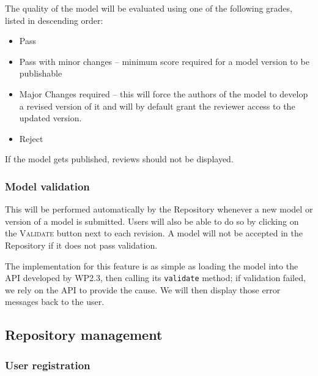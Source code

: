 \begin{techNote}
The quality of the model will be evaluated using one of the following grades, listed in descending order:
\begin{itemize}
\item Pass
\item Pass with minor changes -- minimum score required for a model version to be publishable
\item Major Changes required -- this will force the authors of the model to develop a revised version of it and will by default grant the reviewer access to the updated version. 
\item Reject
\end{itemize}
If the model gets published, reviews should not be displayed. 
\end{techNote}


\subsubsection{Model validation}
This will be performed automatically by the Repository whenever a new model or version of a model is submitted. Users will also be able to do so by clicking on the \textsc{Validate} button next to each revision. A model will not be accepted in the Repository if it does not pass validation. 


\begin{techNote}
The implementation for this feature is as simple as loading the model into the API developed by WP2.3, then calling its \texttt{validate} method; if validation failed, we rely on the API to provide the cause. We will then display those error messages back to the user.
\end{techNote}

\subsection{Repository management} 

\subsubsection{User registration}

